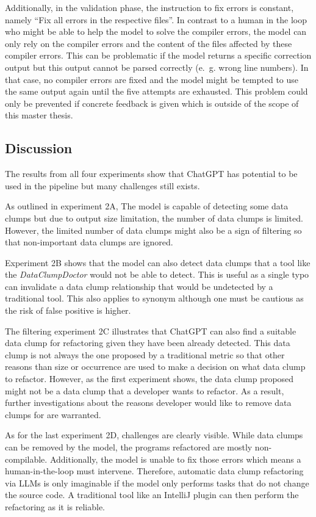 Additionally, in the validation phase, the instruction to fix errors is constant, namely \enquote{Fix all errors in the respective files}. In contrast to a human in the loop who might be able to help the model to solve the compiler errors, the model can only rely on the compiler errors and the content of the files affected by these compiler errors. This can be problematic if the model returns a specific correction output but this output cannot be parsed correctly (e.~g. wrong line numbers). In that case, no compiler errors are fixed and the model might be tempted to use the same output again until the five attempts are exhausted. This problem could only be prevented if concrete feedback is given which is outside of the scope of this master thesis. 

\subsection{Discussion}



The results from all four experiments show that ChatGPT has potential to be used in the pipeline but many challenges still exists.

As outlined in experiment 2A, The model is capable of detecting some data clumps but due to output size limitation, the number of data clumps is limited. However, the limited number of data clumps might also be a sign of filtering so that non-important data clumps are ignored.

Experiment 2B shows that the model can also detect data clumps that a tool like the \textit{DataClumpDoctor} would not be able to detect. This is useful as a single typo can invalidate a data clump relationship that would be undetected by a traditional tool. This also applies to synonym although one must be cautious as the risk of false positive is higher.

The filtering experiment 2C illustrates that ChatGPT can also find a suitable data clump for refactoring given they have been already detected. This data clump is not always the one proposed by a traditional metric so that other reasons than size or occurrence are used to make a decision on what data clump to refactor. However, as the first experiment shows, the data clump proposed might not be a data clump that a developer wants to refactor. As a result, further investigations about the reasons developer would like to remove data clumps for are warranted.

As for the last experiment 2D,  challenges are clearly visible. While data clumps can be removed by the model, the programs refactored are mostly non-compilable. Additionally, the model is unable to fix those errors which means a human-in-the-loop must intervene. Therefore, automatic data clump refactoring via \acp{LLM} is only imaginable if the model only performs tasks that do not change the source code. A traditional tool like an IntelliJ plugin can then perform the refactoring as it is reliable. 


